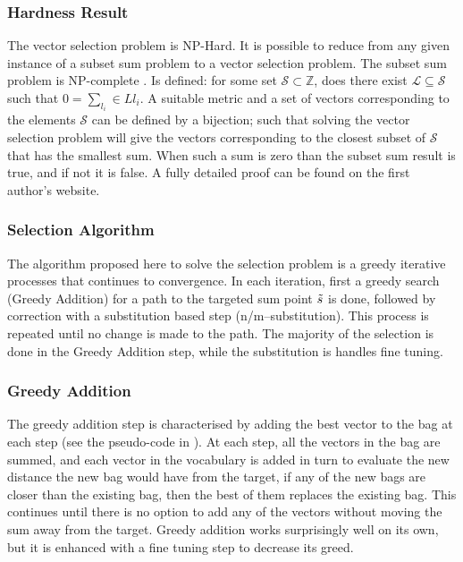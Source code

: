\documentclass[11pt]{article}
\numberwithin{equation}{section}
\numberwithin{figure}{section}
\theoremstyle{plain}
\theoremstyle{definition}
\begin{document}
\subsubsection{Hardness Result}
The vector selection problem is NP-Hard. It is possible to reduce from any given instance of a subset sum problem to a vector selection problem. The subset sum problem is NP-complete \textcite{karp1972reducibility}. Is defined: for some set $\mathcal{S}\subset\mathbb{Z}$, does there exist $\mathcal{L}\subseteq\mathcal{S}$ such that $0=\sum_{l_i}\in L l_i$.  A suitable metric and a set of vectors corresponding to the elements $\mathcal{S}$ can be defined by a bijection; such that solving the vector selection problem will give the vectors corresponding to the closest subset of $\mathcal{S}$ that has the smallest sum. When such a sum is zero than the subset sum result is true, and if not it is false. A fully detailed proof can be found on the first author's website.

\subsubsection{Selection Algorithm}
The algorithm proposed here to solve the selection problem is a greedy iterative processes that continues to convergence. In each iteration, first a greedy search (Greedy Addition) for a path to the targeted sum point $\tilde{s}$ is done, followed by correction with a substitution based step (n/m--substitution). This process is repeated until no change is made to the path. The majority of the selection is done in the Greedy Addition step, while the substitution is handles fine tuning.

\subsubsection{Greedy Addition}
The greedy addition step is characterised by adding the best vector to the bag at each step (see the pseudo-code in ). At each step, all the vectors in the bag are summed, and each vector in the vocabulary is added in turn to evaluate the new distance the new bag would have from the target, if any of the new bags are closer than the existing bag, then the best of them replaces the existing bag. This continues until there is no option to add any of the vectors without moving the sum away from the target. Greedy addition works surprisingly well on its own, but it is enhanced with a fine tuning step to decrease its greed.
\end{document}
